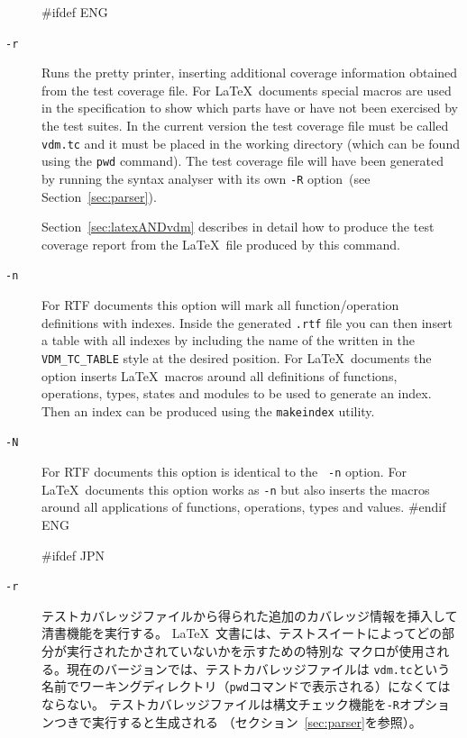 \documentclass[\pformat,12pt]{article}
\begin{document}
\begin{description}

#ifdef ENG
\item[{\tt -r}] Runs the pretty printer, inserting additional coverage
  information obtained from the test coverage file. For \LaTeX\ 
  documents special macros are used in the specification to show which
  parts have or have not been exercised by the test suites.  In the
  current version the test coverage file\index{Test Coverage!File}
  must be called {\tt vdm.tc} 
  and it must be placed in the working directory (which can be found
  using the \texttt{pwd} command). The test
  coverage file will have been generated by running the syntax
  analyser with its own {\tt -R} option~(see Section~\ref{sec:parser}).
  
  Section~\ref{sec:latexANDvdm} describes in detail how to produce the
  test coverage report from the \LaTeX\ file produced by this command.

\item[{\tt -n}] For RTF documents this option will mark all
  function/operation definitions with indexes. Inside the generated
  {\tt .rtf} file you can then insert a table with all indexes by
  including the name of the
   written in the
  \texttt{VDM\_TC\_TABLE} style at the desired position.
  For \LaTeX\ documents the option inserts \LaTeX\ 
  macros around all definitions of functions, operations, types,
  states and modules to be used to generate an index.  Then an
  index can be produced using the {\tt makeindex} utility.

\item[{\tt -N}] For RTF documents this option is identical to the {\tt
    -n} option. For \LaTeX\ documents this option works as {\tt -n}
  but also inserts the macros around all applications of functions,
  operations, types and values. 
#endif ENG

#ifdef JPN
\item[{\tt -r}]
  テストカバレッジファイルから得られた追加のカバレッジ情報を挿入して清書機能を実行する。
  \LaTeX\ 文書には、テストスイートによってどの部分が実行されたかされていないかを示すための特別な
  マクロが使用される。現在のバージョンでは、テストカバレッジファイルは
  {\tt vdm.tc}という名前でワーキングディレクトリ（\texttt{pwd}コマンドで表示される）になくてはならない。
  テストカバレッジファイルは構文チェック機能を{\tt -R}オプションつきで実行すると生成される
  （セクション~\ref{sec:parser}を参照）。
  

\end{description}
\end{document}

